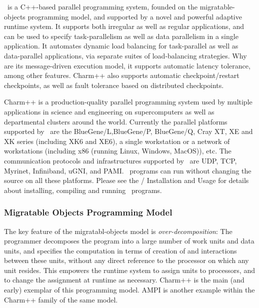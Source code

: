 
\charmpp\ is a C++-based parallel programming system, founded on the
migratable-objects programming model, and supported by a novel and
powerful adaptive runtime system. It supports both irregular as well
as regular applications, and can be used to specify task-parallelism
as well as data parallelism in a single application. It automates
dynamic load balancing for task-parallel as well as data-parallel
applications, via separate suites of load-balancing strategies. Why
are its message-driven execution model, it supports automatic latency
tolerance, among other features. Charm++ also supports automatic
checkpoint/restart checkpoints, as well as fault tolerance based on
distributed checkpoints.

Charm++ is a production-quality parallel programming system used by
multiple applications in science and engineering on supercomputers as
well as departmental clusters around the world.
Currently the parallel platforms supported by \charmpp\ are the
BlueGene/L,BlueGene/P, BlueGene/Q, Cray XT, XE and XK series
(including XK6 and XE6), 
a single workstation or a network of
workstations (including x86 (running Linux, Windows, MacOS)), etc.
The communication protocols and infrastructures supported by
\charmpp\ are UDP, TCP, Myrinet, Infiniband, uGNI, and PAMI. 
\charmpp\ programs can run without changing the source
on all these platforms.  Please see the \charmpp{}/\converse{}
Installation and Usage
for details about installing, compiling and running
\charmpp\ programs.



\subsubsection{Migratable Objects Programming Model} 
The key feature of the migratabl-objects model is {\em
over-decomposition}: The programmer decomposes the program into a
large number of work units and data units, and specifies the
computation in terms of creation of and interactions between these
units, without any direct reference to the processor on which any unit
resides. This empowers the runtime system to assign units to
processors, and to change the assignment at runtime as
necessary. Charm++ is the main (and early) exemplar of this
programming model. AMPI is another example within the Charm++ family
of the same model.



